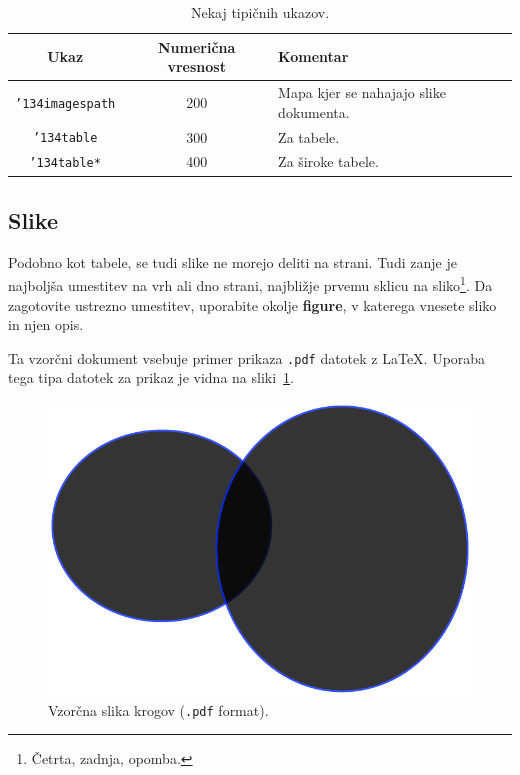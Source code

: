\documentclass[article,slovene]{stucosrec}
\newcommand{\latex}{\LaTeX\xspace}
\begin{document}
	\begin{table}
		\centering
		\caption{Nekaj tipičnih ukazov.}
		\label{tab:table2}
		\begin{tabular}{|c|c|l|} \hline
			Ukaz&Numerična vresnost&Komentar\\ \hline
			\texttt{{\char'134}imagespath} & 200 & Mapa kjer se nahajajo slike dokumenta. \\ \hline
			\texttt{{\char'134}table} & 300 & Za tabele.\\ \hline
			\texttt{{\char'134}table*} & 400& Za široke tabele.\\ \hline
		\end{tabular}
	\end{table}

	\subsection{Slike}
	
	Podobno kot tabele, se tudi slike ne morejo deliti na strani. Tudi zanje je najboljša umestitev na vrh ali dno strani, najbližje prvemu sklicu na sliko\footnote{Četrta, zadnja, opomba.}.
	Da zagotovite ustrezno umestitev, uporabite okolje \textbf{figure}, v katerega vnesete sliko in njen opis.
	
	Ta vzorčni dokument vsebuje primer prikaza \texttt{.pdf} datotek z \latex.
	Uporaba tega tipa datotek za prikaz je vidna na sliki~\ref{fig:circles}.
	
	\begin{figure}
		\centering
		\includegraphics[scale=0.5]{circles.pdf}
		\caption{Vzorčna slika krogov (\texttt{.pdf} format).}
		\label{fig:circles}
	\end{figure}
\end{document}
